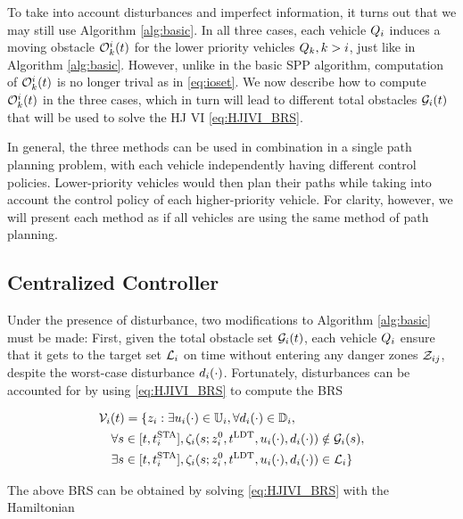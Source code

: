 To take into account disturbances and imperfect information, it turns out that we may still use Algorithm \ref{alg:basic}. In all three cases, each vehicle $Q_{i}$ induces a moving obstacle $\mathcal{O}_k^i(t)$ for the lower priority vehicles $Q_{k}, k>i$, just like in Algorithm \ref{alg:basic}. However, unlike in the basic SPP algorithm, computation of $\mathcal{O}_k^i(t)$ is no longer trival as in \eqref{eq:ioset}. We now describe how to compute $\mathcal{O}_k^i(t)$ in the three cases, which in turn will lead to different total obstacles $\mathcal{G}_i(t)$ that will be used to solve the HJ VI \eqref{eq:HJIVI_BRS}.

In general, the three methods can be used in combination in a single path planning problem, with each vehicle independently having different control policies. Lower-priority vehicles would then plan their paths while taking into account the control policy of each higher-priority vehicle. For clarity, however, we will present each method as if all vehicles are using the same method of path planning.

\subsection{Centralized Controller} \label{sec:incomp_optctrl}
Under the presence of disturbance, two modifications to Algorithm \ref{alg:basic} must be made: First, given the total obstacle set $\mathcal{G}_i(t)$, each vehicle $Q_{i}$ ensure that it gets to the target set $\mathcal{L}_i$ on time without entering any danger zones $\mathcal{Z}_{ij}$, despite the worst-case disturbance $d_i(\cdot)$. Fortunately, disturbances can be accounted for by using \eqref{eq:HJIVI_BRS} to compute the BRS 

\begin{equation}
\label{eq:BRS_cc}
\begin{aligned}
&\brs_i(t) = \{\state_i: \exists \ctrl_i(\cdot) \in \cfset_i, \forall \dstb_i(\cdot) \in \dfset_i, \\
&\quad\forall s \in [t, \sta_i], \traj_i(s; \state^0_i, \ldt, \ctrl_i(\cdot), \dstb_i(\cdot)) \notin \obsset_i(s), \\
&\quad\exists s \in [t, \sta_i], \traj_i(s; \state^0_i, \ldt, \ctrl_i(\cdot), \dstb_i(\cdot)) \in \targetset_i\}
\end{aligned}
\end{equation}

The above BRS can be obtained by solving \eqref{eq:HJIVI_BRS} with the Hamiltonian

